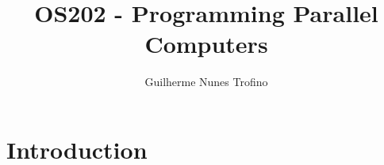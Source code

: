 \documentclass{article}
\title{OS202 - Programming Parallel Computers}
\author{Guilherme Nunes Trofino}
\begin{document}
\maketitle
\setlength{\parindent}{0pt}

\newpage\tableofcontents

\section{Introduction}

















\end{document}
